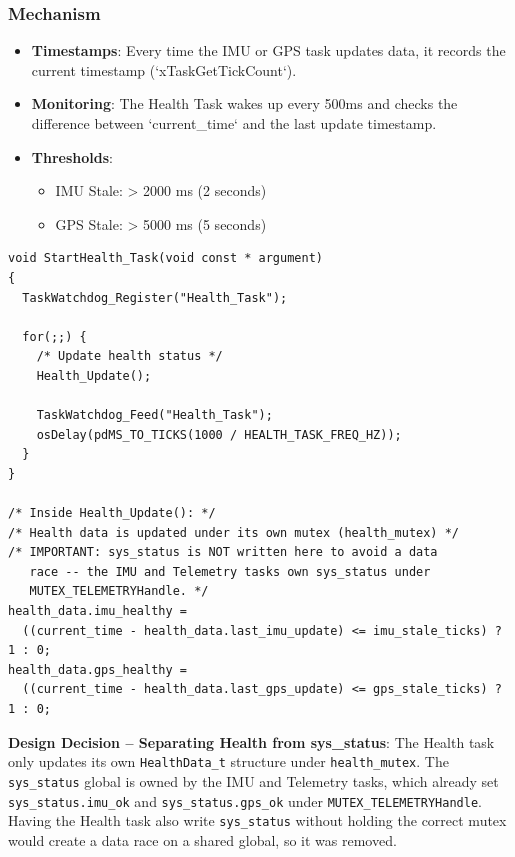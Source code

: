 \documentclass[11pt,a4paper]{article}
\begin{document}
\subsubsection{Mechanism}
\begin{itemize}
    \item \textbf{Timestamps}: Every time the IMU or GPS task updates data, it records the current timestamp (`xTaskGetTickCount`).
    \item \textbf{Monitoring}: The Health Task wakes up every 500ms and checks the difference between `current_time` and the last update timestamp.
    \item \textbf{Thresholds}:
    \begin{itemize}
        \item IMU Stale: > 2000 ms (2 seconds)
        \item GPS Stale: > 5000 ms (5 seconds)
    \end{itemize}
\end{itemize}

\begin{lstlisting}[caption=Health Task Implementation, label=lst:healthtask]
void StartHealth_Task(void const * argument)
{
  TaskWatchdog_Register("Health_Task");
  
  for(;;) {
    /* Update health status */
    Health_Update();
    
    TaskWatchdog_Feed("Health_Task");
    osDelay(pdMS_TO_TICKS(1000 / HEALTH_TASK_FREQ_HZ));
  }
}

/* Inside Health_Update(): */
/* Health data is updated under its own mutex (health_mutex) */
/* IMPORTANT: sys_status is NOT written here to avoid a data
   race -- the IMU and Telemetry tasks own sys_status under
   MUTEX_TELEMETRYHandle. */
health_data.imu_healthy =
  ((current_time - health_data.last_imu_update) <= imu_stale_ticks) ? 1 : 0;
health_data.gps_healthy =
  ((current_time - health_data.last_gps_update) <= gps_stale_ticks) ? 1 : 0;
\end{lstlisting}

\textbf{Design Decision -- Separating Health from sys\_status}:
The Health task only updates its own \texttt{HealthData\_t} structure under \texttt{health\_mutex}.
The \texttt{sys\_status} global is owned by the IMU and Telemetry tasks, which already set
\texttt{sys\_status.imu\_ok} and \texttt{sys\_status.gps\_ok} under \texttt{MUTEX\_TELEMETRYHandle}.
Having the Health task also write \texttt{sys\_status} without holding the correct mutex would
create a data race on a shared global, so it was removed.
\end{document}
